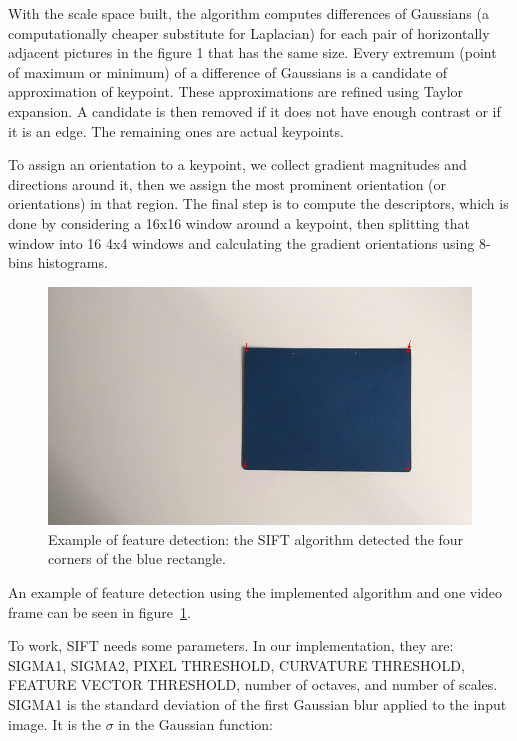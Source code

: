 \documentclass[]{IEEEtran}
\begin{document}
  With the scale space built, the algorithm computes differences of Gaussians (a computationally cheaper substitute for Laplacian) for each pair of horizontally adjacent pictures in the figure 1 that has the same size. Every extremum (point of maximum or minimum) of a difference of Gaussians is a candidate of approximation of keypoint. These approximations are refined using Taylor expansion. A candidate is then removed if it does not have enough contrast or if it is an edge. The remaining ones are actual keypoints.

  To assign an orientation to a keypoint, we collect gradient magnitudes and directions around it, then we assign the most prominent orientation (or orientations) in that region. The final step is to compute the descriptors, which is done by considering a 16x16 window around a keypoint, then splitting that window into 16 4x4 windows and calculating the gradient orientations using 8-bins histograms.

\begin{figure}[h]
  \includegraphics[width=\linewidth]{./figures/sift/four_corners.png}
  \caption{Example of feature detection: the SIFT algorithm detected the four corners of the blue rectangle.}
  \label{fig:four_corners}
\end{figure}

  An example of feature detection using the implemented algorithm and one video frame can be seen in figure~\ref{fig:four_corners}.

  To work, SIFT needs some parameters. In our implementation, they are: SIGMA1, SIGMA2, PIXEL THRESHOLD, CURVATURE THRESHOLD, FEATURE VECTOR THRESHOLD, number of octaves, and number of scales. SIGMA1 is the standard deviation of the first Gaussian blur applied to the input image. It is the $\sigma$ in the Gaussian function:
\end{document}
